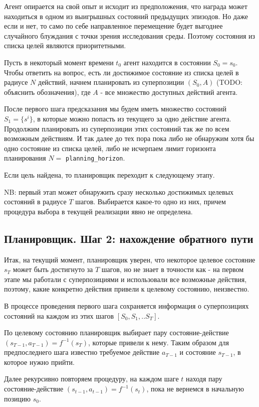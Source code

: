 \documentclass[a4paper]{article}
\begin{document}
Агент опирается на свой опыт и исходит из предположения, что награда может находиться в одном из выигрышных состояний предыдущих эпизодов. Но даже если и нет, то само по себе направленное перемещение будет выгоднее случайного блуждания с точки зрения исследования среды. Поэтому состояния из списка целей являются приоритетными.

Пусть в некоторый момент времени $t_0$ агент находится в состоянии $S_0 = s_0$. Чтобы ответить на вопрос, есть ли достижимое состояние из списка целей в радиусе $N$ действий, начнем планировать из суперпозиции $(S_0, A)$ (TODO: объяснить обозначения), где $A$ - все множество доступных действий агента.

После первого шага предсказания мы будем иметь множество состояний $S_1 = \{s^i\}$, в которые можно попасть из текущего за одно действие агента. Продолжим планировать из суперпозиции этих состояний так же по всем возможным действиям. И так далее до тех пора пока либо не обнаружим хотя бы одно состояние из списка целей, либо не исчерпаем лимит горизонта планирования $N =$ \verb|planning_horizon|.

Если цель найдена, то планировщик переходит к следующему этапу.

NB: первый этап может обнаружить сразу несколько достижимых целевых состояний в радиусе $T$ шагов. Выбирается какое-то одно из них, причем процедура выбора в текущей реализации явно не определена.

\subsection{Планировщик. Шаг 2: нахождение обратного пути}

Итак, на текущий момент, планировщик уверен, что некоторое целевое состояние $s_T$ может быть достигнуто за $T$ шагов, но не знает в точности как - на первом этапе мы работали с суперпозициями и использовали все возможные действия, поэтому, какие конкретно действия привели к целевому состоянию, неизвестно.

В процессе проведения первого шага сохраняется информация о суперпозициях состояний на каждом из этих шагов $[S_0, S_1, .. S_T]$.

По целевому состоянию планировщик выбирает пару состояние-действие $(s_{T-1}, a_{T-1}) = f^{-1}(s_T)$, которые привели к нему. Таким образом для предпоследнего шага известно требуемое действие $a_{T-1}$ и состояние $s_{T-1}$, в которое нужно прийти.

Далее рекурсивно повторяем процедуру, на каждом шаге $t$ находя пару состояние-действие $(s_{t-1}, a_{t-1}) = f^{-1}(s_t)$, пока не вернемся в начальную позицию $s_0$.
\end{document}
